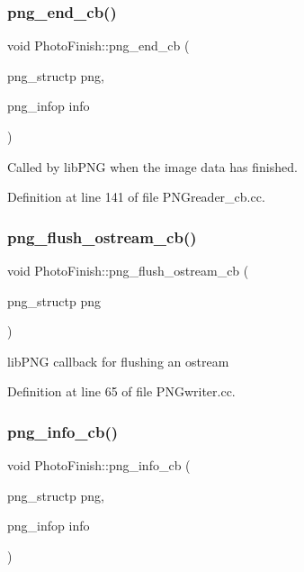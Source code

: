 \subsubsection{\texorpdfstring{png\+\_\+end\+\_\+cb()}{png\_end\_cb()}}
{\footnotesize\ttfamily void Photo\+Finish\+::png\+\_\+end\+\_\+cb (\begin{DoxyParamCaption}\item[{png\+\_\+structp}]{png,  }\item[{png\+\_\+infop}]{info }\end{DoxyParamCaption})}



Called by lib\+P\+NG when the image data has finished. 



Definition at line 141 of file P\+N\+Greader\+\_\+cb.\+cc.

\mbox{\label{namespace_photo_finish_a0e24cee262cabfb1746e8e41a488e059}} 
\subsubsection{\texorpdfstring{png\+\_\+flush\+\_\+ostream\+\_\+cb()}{png\_flush\_ostream\_cb()}}
{\footnotesize\ttfamily void Photo\+Finish\+::png\+\_\+flush\+\_\+ostream\+\_\+cb (\begin{DoxyParamCaption}\item[{png\+\_\+structp}]{png }\end{DoxyParamCaption})}



lib\+P\+NG callback for flushing an ostream 



Definition at line 65 of file P\+N\+Gwriter.\+cc.

\mbox{\label{namespace_photo_finish_abbdfd629905a885c93d81cd53d3caca2}} 
\subsubsection{\texorpdfstring{png\+\_\+info\+\_\+cb()}{png\_info\_cb()}}
{\footnotesize\ttfamily void Photo\+Finish\+::png\+\_\+info\+\_\+cb (\begin{DoxyParamCaption}\item[{png\+\_\+structp}]{png,  }\item[{png\+\_\+infop}]{info }\end{DoxyParamCaption})}



